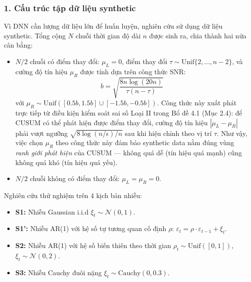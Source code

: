 \subsubsection*{1. Cấu trúc tập dữ liệu synthetic}
Vì DNN cần lượng dữ liệu lớn để huấn luyện, nghiên cứu sử dụng dữ liệu synthetic. 
Tổng cộng $N$ chuỗi thời gian độ dài $n$ được sinh ra, chia thành hai nửa cân bằng:
\begin{itemize}
    \item $N/2$ chuỗi có điểm thay đổi: $\mu_L = 0$, điểm thay đổi $\tau \sim \text{Unif}\{2, \ldots, n-2\}$, 
    và cường độ tín hiệu $\mu_R$ được tính dựa trên công thức SNR:
    $$b = \sqrt{\frac{8n \log(20n)}{\tau(n-\tau)}}$$
    với $\mu_R \sim \text{Unif}([0.5b, 1.5b] \cup [-1.5b, -0.5b])$. 
    Công thức này xuất phát trực tiếp từ điều kiện kiểm soát sai số Loại II 
    trong Bổ đề 4.1 (Mục 2.4): để CUSUM có thể phát hiện được điểm thay đổi, 
    cường độ tín hiệu $|\mu_L - \mu_R|$ phải vượt ngưỡng $\sqrt{8\log(n/\epsilon)/n}$ 
    sau khi hiệu chỉnh theo vị trí $\tau$. 
    Như vậy, việc chọn $\mu_R$ theo công thức này đảm bảo synthetic data nằm đúng 
    vùng \textit{ranh giới phát hiện} của CUSUM --- không quá dễ (tín hiệu quá mạnh) 
    cũng không quá khó (tín hiệu quá yếu).
    \item $N/2$ chuỗi không có điểm thay đổi: $\mu_L = \mu_R = 0$.
\end{itemize}

Nghiên cứu thử nghiệm trên 4 kịch bản nhiễu:
\begin{itemize}
    \item \textbf{S1:} Nhiễu Gaussian i.i.d $\xi_t \sim \mathcal{N}(0, 1)$.
    \item \textbf{S1':} Nhiễu AR(1) với hệ số tự tương quan cố định $\rho$: $\varepsilon_t = \rho \cdot \varepsilon_{t-1} + \xi_t$.
    \item \textbf{S2:} Nhiễu AR(1) với hệ số biến thiên theo thời gian $\rho_t \sim \text{Unif}([0, 1])$, $\xi_t \sim \mathcal{N}(0, 2)$.
    \item \textbf{S3:} Nhiễu Cauchy đuôi nặng $\xi_t \sim \text{Cauchy}(0, 0.3)$.
\end{itemize}

